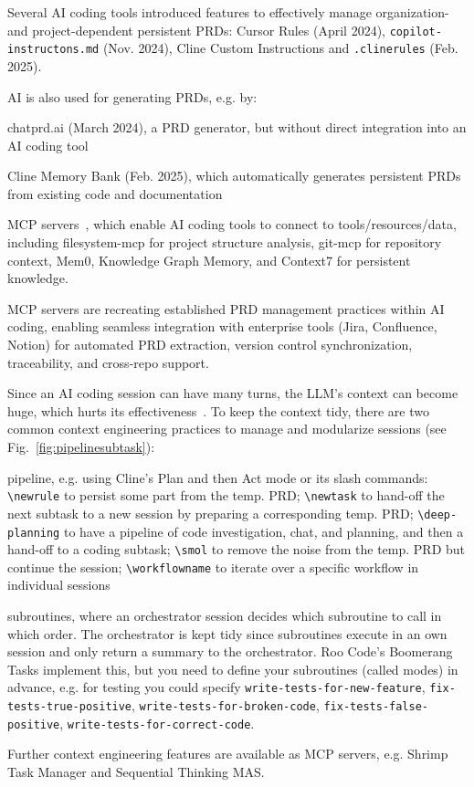 \documentclass[twocolumn,german]{article}
\begin{document}
Several AI coding tools introduced features to effectively manage organization- and project-dependent persistent PRDs:
Cursor Rules (April 2024), \lstinline|copilot-instructons.md| (Nov. 2024), Cline Custom Instructions and \lstinline|.clinerules| (Feb. 2025).

AI is also used for generating PRDs, e.g. by:
\begin{compactitem}
\item chatprd.ai (March 2024), a PRD generator, but without direct integration into an AI coding tool
\item Cline Memory Bank (Feb. 2025), which automatically generates persistent PRDs from existing code and documentation
\item MCP servers~\cite{URL:mcp}, which enable AI coding tools to connect to tools/resources/data,
  including filesystem-mcp for project structure analysis, git-mcp for repository context, Mem0, Knowledge Graph Memory, and Context7 for persistent knowledge.
\end{compactitem}
MCP servers are recreating established PRD management practices within AI coding,
enabling seamless integration with enterprise tools (Jira, Confluence, Notion) for automated PRD extraction,
version control synchronization, traceability, and cross-repo support.

Since an AI coding session can have many turns, the LLM's context can become huge, which hurts its effectiveness~\cite{KH25}.
To keep the context tidy, there are two common context engineering practices to manage and modularize sessions
(see Fig.~\ref{fig:pipelinesubtask}):
\begin{compactitem}
\item pipeline, e.g. using Cline's Plan and then Act mode or its slash commands: 
\lstinline|\newrule| to persist some part from the temp. PRD;
\lstinline|\newtask| to hand-off the next subtask to a new session by preparing a corresponding temp. PRD;
\lstinline|\deep-planning| to have a pipeline of code investigation, chat, and planning,
and then a hand-off to a coding subtask;
\lstinline|\smol| to remove the noise from the temp. PRD but continue the session;
\lstinline|\workflowname| to iterate over a specific workflow in individual sessions
\item subroutines, where an orchestrator session decides which subroutine to call in which order.
The orchestrator is kept tidy since subroutines execute in an own session and only return a summary to the orchestrator.
Roo Code's Boomerang Tasks implement this, but you need to define your subroutines (called modes) in advance,
e.g. for testing you could specify
  \lstinline|write-tests-for-new-feature|, \lstinline|fix-tests-true-positive|, \lstinline|write-tests-for-broken-code|,
  \lstinline|fix-tests-false-positive|, \lstinline|write-tests-for-correct-code|.
\end{compactitem}
Further context engineering features are available as MCP servers, e.g. Shrimp Task Manager and Sequential Thinking MAS.
\end{document}
